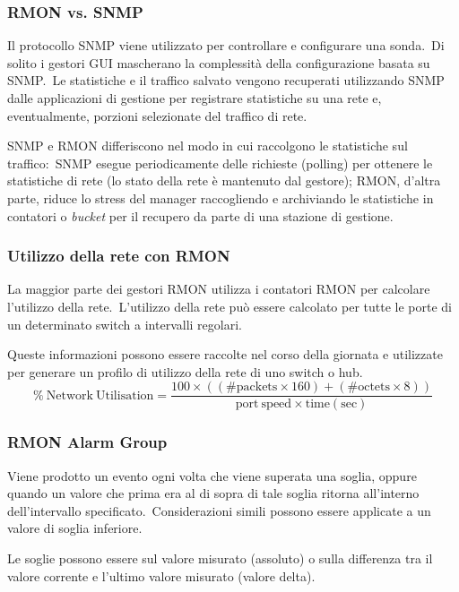 \subsubsection{RMON vs. SNMP}

Il protocollo SNMP viene utilizzato per controllare e configurare una sonda.\
Di solito i gestori GUI mascherano la complessità della configurazione basata su SNMP.\
Le statistiche e il traffico salvato vengono recuperati utilizzando SNMP dalle applicazioni di gestione per registrare statistiche su una rete e, eventualmente, porzioni selezionate del traffico di rete.

SNMP e RMON differiscono nel modo in cui raccolgono le statistiche sul traffico:\ SNMP esegue periodicamente delle richieste (polling) per ottenere le statistiche di rete (lo stato della rete è mantenuto dal gestore); RMON, d'altra parte, riduce lo stress del manager raccogliendo e archiviando le statistiche in contatori o \textit{bucket} per il recupero da parte di una stazione di gestione.\


\subsubsection{Utilizzo della rete con RMON}

La maggior parte dei gestori RMON utilizza i contatori RMON per calcolare l'utilizzo della rete.\
L'utilizzo della rete può essere calcolato per tutte le porte di un determinato switch a intervalli regolari.\

Queste informazioni possono essere raccolte nel corso della giornata e utilizzate per generare un profilo di utilizzo della rete di uno switch o hub.
\[ \%\ \mathrm{Network\ Utilisation} = \frac{100 \times ((\#\mathrm{packets} \times 160)+ (\#\mathrm{octets}\times 8))}{\mathrm{port\ speed \times time(sec)}}\]

\subsubsection{RMON Alarm Group}

Viene prodotto un evento ogni volta che viene superata una soglia, oppure quando un valore che prima era al di sopra di tale soglia ritorna all'interno dell'intervallo specificato.\
Considerazioni simili possono essere applicate a un valore di soglia inferiore.\

Le soglie possono essere sul valore misurato (assoluto) o sulla differenza tra il valore corrente e l'ultimo valore misurato (valore delta).
